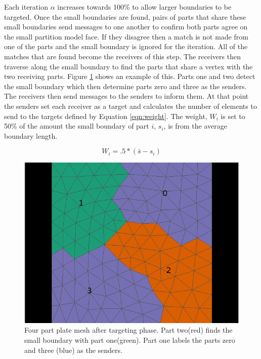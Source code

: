 \documentclass{thesis}
\begin{document}
Each iteration $\alpha$ increases towards 100\% to allow larger boundaries to 
be targeted. Once the small boundaries are found, pairs of parts that share 
these small boundaries send messages to one another to confirm both parts 
agree on the small partition model face. If they disagree then a match is 
not made from one of the parts and the small boundary is ignored for the 
iteration. All of the matches 
that are found become the receivers of this step. The receivers then 
traverse along the small boundary to find the parts that share a vertex 
with the two receiving parts. Figure \ref{fig:boundary} shows an example 
of this. Parts one and two detect the small boundary which then determine 
parts zero and three as the senders. The receivers then send messages to the 
senders to inform them. At that point the senders set each receiver as a 
target and calculates the number of elements to send to the targets defined 
by Equation \ref{eqn:weight}. The weight, $W_i$ is set to 50\% of the amount the small boundary of part $i$, $s_i$, is from the average boundary length. %

\begin{equation}
\label{eqn:weight}
W_i = .5*(\bar{s}-s_i)
\end{equation}  

\begin{figure} [!h]
\centering
\captionsetup{justification=centering,margin=1cm}
\includegraphics[width=.6\textwidth]{target_example.png}
\caption{\label{fig:boundary} \textnormal{Four part plate mesh after targeting phase. Part two(red) finds the small boundary with part one(green). Part one labels the parts zero and three (blue) as the senders.}}
\end{figure}
\end{document}

